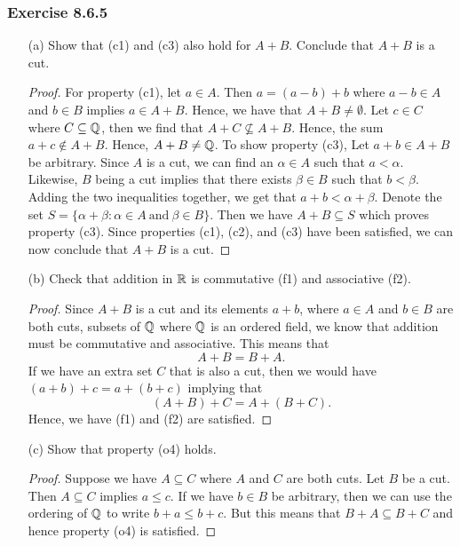 \subsubsection{Exercise 8.6.5} 
\begin{enumerate}
    \item[(a)] Show that (c1) and (c3) also hold for \( A + B  \). Conclude that \( A +  B \) is a cut.
        \begin{proof}
        For property (c1), let \( a \in A  \). Then \( a = (a-b) + b \) where \( a -b \in A  \) and \( b \in B  \) implies \( a \in A + B  \). Hence, we have that \( A + B \neq \emptyset \). Let \(  c \in C  \) where \( C \subseteq \mathbb{Q}   \), then we find that \( A + C \not\subseteq A + B  \). Hence, the sum \( a+c \notin A + B \). Hence, \( A + B \neq \mathbb{Q}  \). 
        To show property (c3), Let \( a + b \in A +  B  \) be arbitrary. Since \( A  \) is a cut, we can find an \( \alpha \in A \) such that \( a < \alpha  \). Likewise, \( B  \) being a cut implies that there exists \( \beta \in B  \) such that \( b < \beta \). Adding the two inequalities together, we get that \(  a+b < \alpha + \beta \). Denote the set \( S = \{ \alpha + \beta : \alpha \in A \ \text{and} \ \beta \in B  \}  \). Then we have \( A + B \subseteq S  \) which proves property (c3). Since properties (c1), (c2), and (c3) have been satisfied, we can now conclude that \( A + B  \) is a cut.
        \end{proof}
    \item[(b)] Check that addition in \( \mathbb{R}  \) is commutative (f1) and associative (f2).
        \begin{proof}
        Since \( A + B  \) is a cut and its elements \( a + b   \), where \( a \in A  \) and \( b \in B  \) are both cuts, subsets of \( \mathbb{Q}  \) where \( \mathbb{Q}  \) is an ordered field, we know that addition must be commutative and associative. This means that 
        \[  A + B = B + A.\] If we have an extra set \( C  \) that is also a cut, then we would have \( (a+b) + c = a + (b+c)  \) implying that 
        \[  (A+B) + C = A + (B+C). \] 
        Hence, we have (f1) and (f2) are satisfied.
        \end{proof}
    \item[(c)] Show that property (o4) holds.
        \begin{proof}
        Suppose we have \( A \subseteq C  \) where \( A  \) and \( C  \) are both cuts.         Let \( B  \) be a cut. Then \( A \subseteq C \) implies \( a \leq c  \). If we have \( b \in B  \) be arbitrary, then we can use the ordering of \( \mathbb{Q}  \) to write \( b + a \leq b + c  \). But this means that \(  B + A \subseteq B + C  \) and hence property (o4) is satisfied.

\end{proof}
\end{enumerate}
